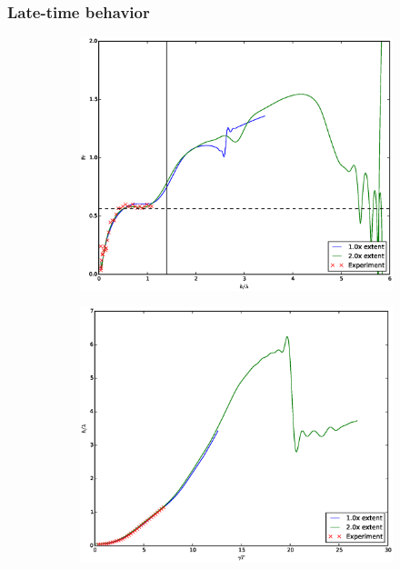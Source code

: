 \subsubsection{Late-time behavior}

\begin{figure}
\begin{subfigure}[b]{0.5\textwidth}
  \includegraphics[width=\textwidth]{plts/Fr_long}
\end{subfigure}
\begin{subfigure}[b]{0.5\textwidth}
  \includegraphics[width=\textwidth]{plts/aspect_long}

\end{subfigure}
\end{figure}
